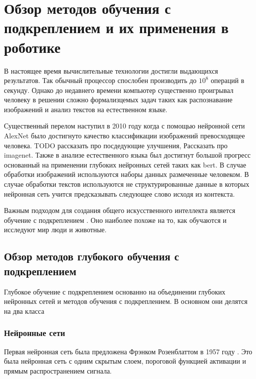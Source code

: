 \chapter{Обзор методов обучения с подкреплением и их применения в роботике}\label{ch:ch1}


В настоящее время вычислительные технологии достигли выдающихся результатов. Так обычный процессор спослобен производить до $10^8$ операций в секунду. Однако до недавнего времени компьютер существенно проигрывал человеку в решении сложно формализцемых задач таких как распознавание изображений и анализ текстов на естественном языке. 

Существенный перелом наступил в 2010 году когда с помощью нейронной сети AlexNet было достигнуто качество классификации изображений превосходящее человека. TODO рассказать про посдедующие улучшения, Рассказать про imagenet.
Также в анализе естественного языка был достигнут большой прогресс основанный на применении глубоких нейронных сетей таких как bert. В случае обработки изображений используются наборы данных размеченные человеком. В случае обработки текстов используются не структурированные данные в которых нейронная сеть учится предсказывать следующее слово исходя из контекста. 

Важным подходом для создания общего искусственного интеллекта является обучение с подкреплением \cite{reward_is_enough}. Оно наиболее похоже на то, как обучаются и исследуют мир люди и животные.  


\section{Обзор методов глубокого обучения с подкреплением}\label{sec:ch1/sec1}

Глубокое обучение с подкреплением основанно на объединении глубоких нейронных сетей и методов обучения с подкреплением. 
В основном они делятся на два класса 

\subsection{Нейронные сети}

Первая нейронная сеть была предложена Фрэнком Розенблаттом в 1957 году \cite{rosenblatt}. Это была нейронная сеть с одним скрытым слоем, пороговой функцией активации и прямым распространением сигнала. 



